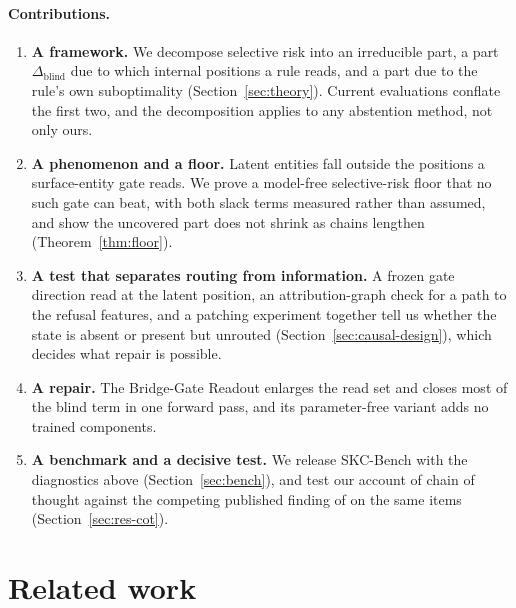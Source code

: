 \documentclass{article}
\begin{document}
\paragraph{Contributions.}
\begin{enumerate}
\itemsep0em
\item \textbf{A framework.} We decompose selective risk into an irreducible part, a part
$\Delta_{\mathrm{blind}}$ due to which internal positions a rule reads, and a part due to the rule's
own suboptimality (Section~\ref{sec:theory}). Current evaluations conflate the first two, and the
decomposition applies to any abstention method, not only ours.
\item \textbf{A phenomenon and a floor.} Latent entities fall outside the positions a surface-entity
gate reads. We prove a model-free selective-risk floor that no such gate can beat, with both slack
terms measured rather than assumed, and show the uncovered part does not shrink as chains lengthen
(Theorem~\ref{thm:floor}).
\item \textbf{A test that separates routing from information.} A frozen gate direction read at the
latent position, an attribution-graph check for a path to the refusal features, and a patching
experiment together tell us whether the state is absent or present but unrouted
(Section~\ref{sec:causal-design}), which decides what repair is possible.
\item \textbf{A repair.} The Bridge-Gate Readout enlarges the read set and closes most of the blind
term in one forward pass, and its parameter-free variant adds no trained components.
\item \textbf{A benchmark and a decisive test.} We release SKC-Bench with the diagnostics above
(Section~\ref{sec:bench}), and test our account of chain of thought against the competing published
finding of \citet{cheng2025cotobscures} on the same items (Section~\ref{sec:res-cot}).
\end{enumerate}

\section{Related work}
\end{document}
